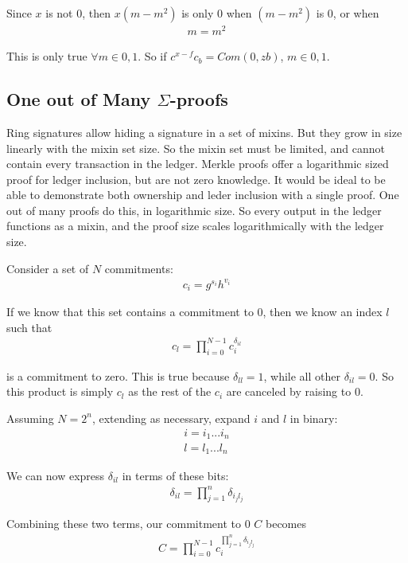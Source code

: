 \documentclass{article}
\begin{document}
Since $x$ is not $0$, then $x (m-m^2)$ is only $0$ when $(m-m^2)$ is $0$, or when
\begin{align}
  m = m^2
\end{align}

This is only true $\forall m \in {0,1}$.  So if $c^{x-f} c_b = Com(0,zb)$, $m \in {0,1}$.


\subsection{One out of Many $\Sigma$-proofs}

Ring signatures allow hiding a signature in a set of mixins.  But they grow in size linearly with the mixin set size.  So the mixin set must be limited, and cannot contain every transaction in the ledger.  Merkle proofs offer a logarithmic sized proof for ledger inclusion, but are not zero knowledge.  It would be ideal to be able to demonstrate both ownership and leder inclusion with a single proof.  One out of many proofs do this, in logarithmic size.  So every output in the ledger functions as a mixin, and the proof size scales logarithmically with the ledger size.

Consider a set of $N$ commitments:
\begin{align}
  c_i = g^{s_i} h^{v_i}
\end{align}

If we know that this set contains a commitment to $0$, then we know an index $l$ such that
\begin{align}
  c_l = \prod_{i=0}^{N-1} c_i^{\delta_{il}}
\end{align}

is a commitment to zero.  This is true because $\delta_{ll} = 1$, while all other $\delta_{il} = 0$. So this product is simply $c_l$ as the rest of the $c_i$ are canceled by raising to $0$.

Assuming $N = 2^n$, extending as necessary, expand $i$ and $l$ in binary:
\begin{align}
  i = i_1...i_n\\
  l = l_1...l_n
\end{align}

We can now express $\delta_{il}$ in terms of these bits:
\begin{align}
  \delta_{il} = \prod_{j=1}^{n} \delta_{i_jl_j}
\end{align}
  
Combining these two terms, our commitment to $0$ $C$ becomes
\begin{align}
  C = \prod_{i=0}^{N-1}c_i^{\prod_{j=1}^{n} \delta_{i_jl_j}}
\end{align}
\end{document}
